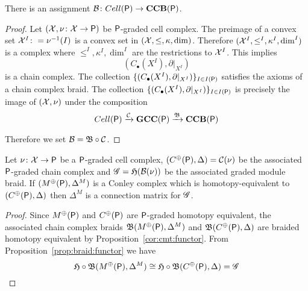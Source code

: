 \begin{prop}
There is an assignment ${\mathcal B}\colon Cell({\mathsf P})\to {\bf CCB}({\mathsf P})$.
\end{prop}
\begin{proof}
Let $({\mathcal X},\nu\colon {\mathcal X}\to {\mathsf P})$ be ${\mathsf P}$-graded cell complex.   The preimage of a convex set ${\mathcal X}^I\colon =\nu^{-1}(I)$ is a convex set in $({\mathcal X},\leq,\kappa,\dim)$.  Therefore $({\mathcal X}^I,\leq^I,\kappa^I,\dim^I)$ is a complex where $\leq^I,\kappa^I,\dim^I$ are the restrictions to ${\mathcal X}^I$.  This implies $$(C_\bullet(X^I),\partial|_{X^I})$$ is a chain complex.  The collection $\{(C_\bullet(X^I),\partial|_{X^I})\}_{I\in I({\mathsf P})}$ satisfies the axioms of a chain complex braid. The collection $\{(C_\bullet(X^I),\partial|_{X^I})\}_{I\in I({\mathsf P})}$ is precisely the image of $({\mathcal X},\nu)$ under the composition $$Cell({\mathsf P})\xrightarrow{{\mathcal C}} {\bf GCC({\mathsf P})} \xrightarrow{\mathfrak{B}} {\bf CCB}({\mathsf P})$$

Therefore we set ${\mathcal B} = \mathfrak{B}\circ {\mathcal C}$.

\end{proof}





\begin{thm}
Let $\nu \colon {\mathcal X}\to {\mathsf P}$ be a ${\mathsf P}$-graded cell complex, $(C^\oplus({\mathsf P}),\Delta)={\mathcal C}(\nu)$ be the associated ${\mathsf P}$-graded chain complex and $\mathscr{G} = \mathfrak{H}({\mathcal B}(\nu))$ be the associated graded module braid.  If $(M^\oplus({\mathsf P}),\Delta^M)$ is a Conley complex which is homotopy-equivalent to $(C^\oplus({\mathsf P}),\Delta)$ then $\Delta^M$ is a connection matrix for $\mathscr{G}$.
\end{thm}
\begin{proof}
Since $M^\oplus({\mathsf P})$ and $C^\oplus({\mathsf P})$ are ${\mathsf P}$-graded homotopy equivalent, the associated chain complex braids $\mathfrak{B}(M^\oplus({\mathsf P}),\Delta^M)$ and $\mathfrak{B}(C^\oplus({\mathsf P}),\Delta)$ are braided homotopy equivalent by Proposition~\ref{cor:cmt:functor}.  From Proposition~\ref{prop:braid:functor} we have $$\mathfrak{H}\circ \mathfrak{B}(M^\oplus({\mathsf P}),\Delta^M)\cong \mathfrak{H}\circ \mathfrak{B}(C^\oplus({\mathsf P}),\Delta)=\mathscr{G}$$ 

\end{proof}




